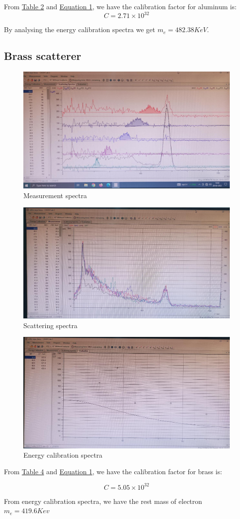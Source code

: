 		
		

		From \hyperref[tab:2]{Table 2} and \hyperref[eq:1]{Equation 1}, we have the calibration factor for aluminum is:
		$$C=2.71\times 10^{32}$$

		By analysing the energy calibration spectra we get $m_e=482.38 KeV$.


	\subsection{Brass scatterer}
		\begin{figure}[H]
			\centering
			\includegraphics[width=0.75\columnwidth]{images/o_6.png}
			\caption{Measurement spectra}
			\label{graph:4}
		\end{figure}
		\begin{figure}[H]
			\centering
			\includegraphics[width=0.75\columnwidth]{images/o_7.png}
			\caption{Scattering spectra}
			\label{graph:5}
		\end{figure}
		\begin{figure}[H]
			\centering
			\includegraphics[width=0.75\columnwidth]{images/o_5.png}
			\caption{Energy calibration spectra}
			\label{graph:6}
		\end{figure}

		
		

		From \hyperref[tab:4]{Table 4} and \hyperref[eq:1]{Equation 1}, we have the calibration factor for brass is:
		
		$$C=5.05\times 10^{32}$$
		
		From energy calibration spectra, we have the rest mass of electron $m_e =419.6Kev$
